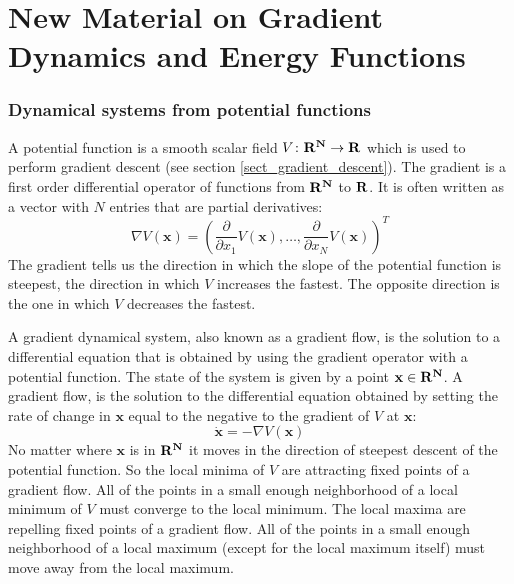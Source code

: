 \chapter{New Material on Gradient Dynamics and Energy Functions}


\subsection{Dynamical systems from potential functions}

   A potential function is a smooth scalar field $V \colon \bf{R}^N \to 
\bf{R}$ which is used to perform gradient descent (see section 
\ref{sect_gradient_descent}). The gradient is a first order 
differential operator of functions from $\bf{R}^N$ to $\bf{R}$.  It is often
written as a vector with $N$ entries that are partial derivatives:
\begin{equation*}
   \nabla V(\mathbf{x}) = \left( \dfrac{\partial}{\partial x_1} V(\mathbf{x}),
\ldots, \dfrac{\partial}{\partial x_N} V(\mathbf{x}) \right)^T
\end{equation*}
The gradient tells us the direction in which the slope of the potential 
function is steepest, the direction in which $V$ increases the fastest.  The 
opposite direction is the one in which $V$ decreases the fastest.  

   A gradient dynamical system, also known as a gradient flow, is the solution 
to a differential equation that is obtained by using the gradient operator with
a potential function.  The state of the system is given by a point $\mathbf{x} 
\in \bf{R}^N$.  A gradient flow, is the solution to the differential equation 
obtained by setting the rate of change in $\mathbf{x}$ equal to the negative to 
the gradient of $V$ at $\mathbf{x}$:
\begin{equation}
   \dot{\mathbf{x}} = -\nabla V(\mathbf{x}) 
\end{equation}
No matter where $\mathbf{x}$ is in $\bf{R}^N$ it moves in the direction of
steepest descent of the potential function.  So the local minima of $V$ are 
attracting fixed points of a gradient flow.  All of the points in a small 
enough neighborhood of a local minimum of $V$ must converge to the local 
minimum.  The local maxima are repelling fixed points of a gradient flow.  All 
of the points in a small enough neighborhood of a local maximum (except for 
the local maximum itself) must move away from the local maximum.  

